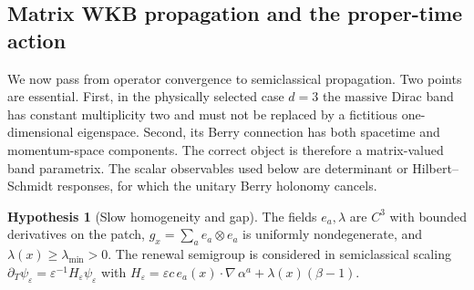 \documentclass[11pt]{article}
\theoremstyle{definition}
\newtheorem{hypothesis}[theorem]{Hypothesis}
\theoremstyle{remark}
\newcommand{\eps}{\varepsilon}
\begin{document}
\subsection{Matrix WKB propagation and the proper-time action}

We now pass from operator convergence to semiclassical propagation.  Two points
are essential.  First, in the physically selected case $d=3$ the massive Dirac
band has constant multiplicity two and must not be replaced by a fictitious
one-dimensional eigenspace.  Second, its Berry connection has both spacetime and
momentum-space components.  The correct object is therefore a matrix-valued band
parametrix.  The scalar observables used below are determinant or
Hilbert--Schmidt responses, for which the unitary Berry holonomy cancels.

\begin{hypothesis}[Slow homogeneity and gap]
\label{hyp:SH}
The fields $e_a,\lambda$ are $C^3$ with bounded derivatives on the patch,
$g_x=\sum_a e_a\otimes e_a$ is uniformly nondegenerate, and
$\lambda(x)\ge\lambda_{\min}>0$.  The renewal semigroup is considered in
semiclassical scaling
$\partial_T\psi_\eps=\eps^{-1}H_\eps\psi_\eps$ with
$H_\eps=\eps c\,e_a(x)\cdot\nabla\,\alpha^a+\lambda(x)(\beta-1)$.
\end{hypothesis}
\end{document}
